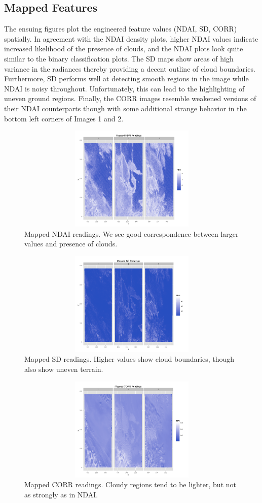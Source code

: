 \documentclass{article}\usepackage[]{graphicx}\usepackage[]{color}
\begin{document}
\subsection{Mapped Features}
The ensuing figures plot the engineered feature values (NDAI, SD, CORR) spatially. In agreement with the NDAI density plots, higher NDAI values indicate increased likelihood of the presence of clouds, and the NDAI plots look quite similar to the binary classification plots. The SD maps show areas of high variance in the radiances thereby providing a decent outline of cloud boundaries. Furthermore, SD performs well at detecting smooth regions in the image while NDAI is noisy throughout. Unfortunately, this can lead to the highlighting of uneven ground regions. Finally, the CORR images resemble weakened versions of their NDAI counterparts though with some additional strange behavior in the bottom left corners of Images 1 and 2. 
\begin{figure}[H]
\includegraphics[width = 18cm, height = 5cm]{NDAIEDA.png}
\caption{Mapped NDAI readings. We see good correspondence between larger values and presence of clouds.}
\end{figure}

\begin{figure}[H]
\includegraphics[width = 18cm, height = 5cm]{SDEDA.png}
\caption{Mapped SD readings. Higher values show cloud boundaries, though also show uneven terrain.}
\end{figure}

\begin{figure}[H]
\includegraphics[width = 18cm, height = 5cm]{CORREDA.png}
\caption{Mapped CORR readings. Cloudy regions tend to be lighter, but not as strongly as in NDAI.}
\end{figure}
\end{document}
